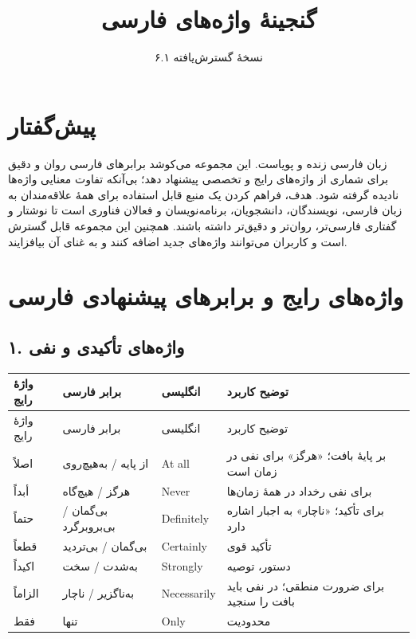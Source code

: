 \documentclass[a4paper,12pt,openany]{book}
\begin{document}
\title{گنجینهٔ واژه‌های فارسی}
\author{نسخهٔ گسترش‌یافته ۶.۱}
\date{}
\maketitle

\chapter*{پیش‌گفتار}
زبان فارسی زنده و پویاست. این مجموعه می‌کوشد برابرهای فارسی روان و دقیق برای شماری از واژه‌های رایج و تخصصی پیشنهاد دهد؛ بی‌آنکه تفاوت معنایی واژه‌ها نادیده گرفته شود.
هدف، فراهم کردن یک منبع قابل استفاده برای همهٔ علاقه‌مندان به زبان فارسی، نویسندگان، دانشجویان، برنامه‌نویسان و فعالان فناوری است تا نوشتار و گفتاری فارسی‌تر، روان‌تر و دقیق‌تر داشته باشند.
همچنین این مجموعه قابل گسترش است و کاربران می‌توانند واژه‌های جدید اضافه کنند و به غنای آن بیافزایند.

\chapter{واژه‌های رایج و برابرهای پیشنهادی فارسی}

\section*{۱. واژه‌های تأکیدی و نفی}
\begingroup
\small
\setlength{\tabcolsep}{4pt}
\renewcommand{\arraystretch}{1.25}
\begin{longtable}{|p{2.5cm}|p{4.0cm}|p{2.3cm}|p{5.3cm}|}
\hline
واژهٔ رایج & برابر فارسی & انگلیسی & توضیح کاربرد \\
\hline
\endfirsthead
\hline
واژهٔ رایج & برابر فارسی & انگلیسی & توضیح کاربرد \\
\hline
\endhead
اصلاً & از پایه / به‌هیچ‌روی & \textenglish{At all} & بر پایهٔ بافت؛ «هرگز» برای نفی در زمان است \\
أبداً & هرگز / هیچ‌گاه & \textenglish{Never} & برای نفی رخداد در همهٔ زمان‌ها \\
حتماً & بی‌گمان / بی‌بروبرگرد & \textenglish{Definitely} & برای تأکید؛ «ناچار» به اجبار اشاره دارد \\
قطعاً & بی‌گمان / بی‌تردید & \textenglish{Certainly} & تأکید قوی \\
اکیداً & به‌شدت / سخت & \textenglish{Strongly} & دستور، توصیه \\
الزاماً & به‌ناگزیر / ناچار & \textenglish{Necessarily} & برای ضرورت منطقی؛ در نفی باید بافت را سنجید \\
فقط & تنها & \textenglish{Only} & محدودیت \\
\hline
\end{longtable}
\endgroup
\end{document}
